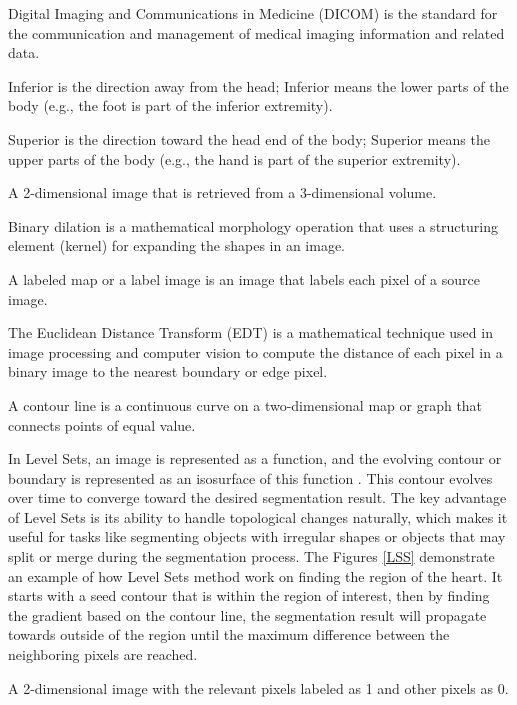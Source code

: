 \begin{description}[font=\rmfamily\bfseries, leftmargin=3cm, style=nextline]
	\item[DICOM] Digital Imaging and Communications in Medicine (DICOM) is the standard for the communication and management of medical imaging information and related data.
	\item[Inferior] Inferior is the direction away from the head; Inferior means the lower parts of the body (e.g., the foot is part of the inferior extremity).
	\item[Superior] Superior is the direction toward the head end of the body; Superior means the upper parts of the body (e.g., the hand is part of the superior extremity).
	\item[Slice] A 2-dimensional image that is retrieved from a 3-dimensional volume.
	\item[Binary Dilation] Binary dilation is a mathematical morphology operation that uses a structuring element (kernel) for expanding the shapes in an image.
	\item[Label Map] A labeled map or a label image is an image that labels each pixel of a source image. 
	\item[Euclidean Distance Transform] The Euclidean Distance Transform (EDT) is a mathematical technique used in image processing and computer vision to compute the distance of each pixel in a binary image to the nearest boundary or edge pixel.
	\item[Contour Line] A contour line is a continuous curve on a two-dimensional map or graph that connects points of equal value.
	\item[Level Sets] In Level Sets, an image is represented as a function, and the evolving contour or boundary is represented as an isosurface of this function \cite{Rueden_2021}. This contour evolves over time to converge toward the desired segmentation result. The key advantage of Level Sets is its ability to handle topological changes naturally, which makes it useful for tasks like segmenting objects with irregular shapes or objects that may split or merge during the segmentation process. The Figures \ref{LSS} demonstrate an example of how Level Sets method work on finding the region of the heart. It starts with a seed contour that is within the region of interest, then by finding the gradient based on the contour line, the segmentation result will propagate towards outside of the region until the maximum difference between the neighboring pixels are reached.	
	\item[Segmented slice] A 2-dimensional image with the relevant pixels labeled as 1 and other pixels as 0.	

\end{description}
